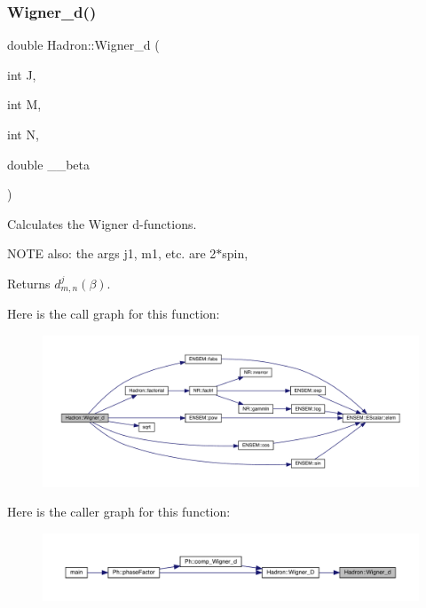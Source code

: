 \subsubsection{\texorpdfstring{Wigner\_d()}{Wigner\_d()}}
{\footnotesize\ttfamily double Hadron\+::\+Wigner\+\_\+d (\begin{DoxyParamCaption}\item[{int}]{J,  }\item[{int}]{M,  }\item[{int}]{N,  }\item[{double}]{\+\_\+\+\_\+beta }\end{DoxyParamCaption})}

Calculates the Wigner d-\/functions.

N\+O\+TE also\+: the args j1, m1, etc. are 2$\ast$spin,

\begin{DoxyReturn}{Returns}
$d^{j}_{m,n}(\beta)$. 
\end{DoxyReturn}
Here is the call graph for this function\+:\nopagebreak
\begin{figure}[H]
\begin{center}
\leavevmode
\includegraphics[width=350pt]{d1/daf/namespaceHadron_a63c49af65c1d943a78205d3b8b63079a_cgraph}
\end{center}
\end{figure}
Here is the caller graph for this function\+:
\nopagebreak
\begin{figure}[H]
\begin{center}
\leavevmode
\includegraphics[width=350pt]{d1/daf/namespaceHadron_a63c49af65c1d943a78205d3b8b63079a_icgraph}
\end{center}
\end{figure}
\mbox{\label{namespaceHadron_a4d99a17c00bdddfc88a14c0571b74338}} 
